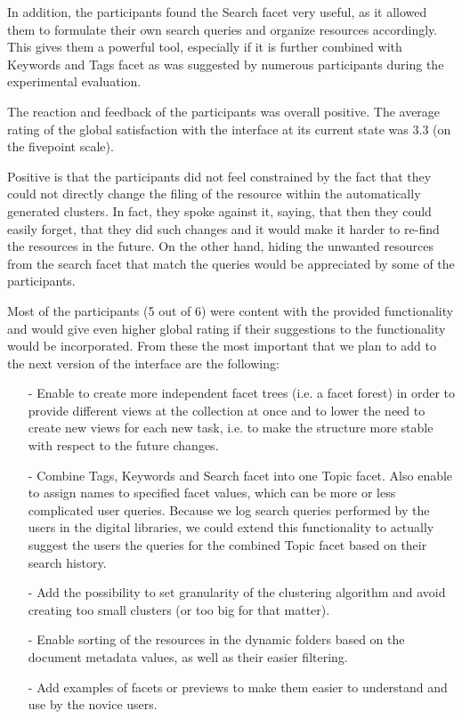 \documentclass[12pt]{article}
\begin{document}
 In addition, the participants found the Search facet very useful, as it allowed them to formulate their own search queries and organize resources accordingly. This gives them a powerful tool, especially if it is further combined with Keywords and Tags facet as was suggested by numerous participants during the experimental evaluation.
 
 The reaction and feedback of the participants was overall positive. The average rating of the global satisfaction with the interface at its current state was 3.3 (on the fivepoint scale). 

Positive is that the participants did not feel constrained by the fact that they could not directly change the filing of the resource within the automatically generated clusters. In fact, they spoke against it, saying, that then they could easily forget, that they did such changes and it would make it harder to re-find the resources in the future. On the other hand, hiding the unwanted resources from the search facet that match the queries would be appreciated by some of the participants.
 
  Most of the participants (5 out of 6) were content with the provided functionality and would give even higher global rating if their suggestions to the functionality would be incorporated. From these the most important that we plan to add to the next version of the interface are the following: 
  
    \begin{itemize}
        \item[-] Enable to create more independent facet trees (i.e. a facet forest) in order to provide different views at the collection at once and to lower the need to create new views for each new task, i.e. to make the structure more stable with respect to the future changes.
        \item[-]Combine Tags, Keywords and Search facet into one Topic facet. Also enable to assign names to specified facet values, which can be more or less complicated user queries. Because we log search queries performed by the users in the digital libraries, we could extend this functionality to actually suggest the users the queries for the combined Topic facet based on their search history. 
        \item[-]Add the possibility to set granularity of the clustering algorithm and avoid creating too small clusters (or too big for that matter). 
        \item[-] Enable sorting of the resources in the dynamic folders based on the document metadata values, as well as their easier filtering. 
        \item[-] Add examples of facets or previews to make them easier to understand and use by the novice users. 
        \end{itemize}
\end{document}
